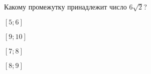 \begin{ex}
	\begin{condition}
		Какому промежутку принадлежит число $6\sqrt{2}$?
		
		\selectanswer
		\begin{enumcols}[columns=4]
			\item $[5;6]$
			\item $[9;10]$
			\item $[7;8]$
			\item $[8;9]$
		\end{enumcols}
	\end{condition}
\end{ex}